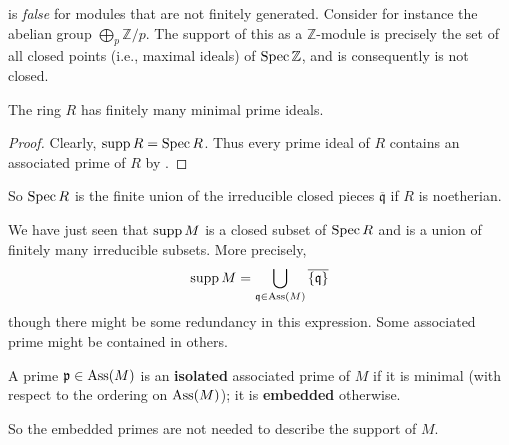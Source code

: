 \begin{example} 
 is \emph{false} for modules that are not finitely
generated. Consider for instance the abelian group $\bigoplus_p \mathbb{Z}/p$.
The support of this as a $\mathbb{Z}$-module is precisely the set of all
closed points (i.e., maximal ideals) of $\operatorname{Spec} \mathbb{Z}$, and is
consequently is not closed. 
\end{example} 

\begin{corollary} 
The ring $R$ has finitely many minimal prime ideals. 
\end{corollary} 
\begin{proof} 
Clearly, $\operatorname{supp} R = \operatorname{Spec} R$. Thus every prime ideal of $R$
contains an associated prime of $R$ by .
\end{proof} 

So $\operatorname{Spec} R$ is the finite union of the  irreducible closed  pieces
$\overline{\mathfrak{q}}$ if $R$ is noetherian.

We have just seen that $\operatorname{supp} M$ is a closed subset of $\operatorname{Spec} R$ and is a union
of finitely many irreducible subsets.  More precisely, 
\[ \operatorname{supp} M = \bigcup_{\mathfrak{q} \in \operatorname{Ass}(M)}
\overline{\left\{\mathfrak{q}\right\}}  \]
though there might be some redundancy in this expression. Some associated prime might be contained
in others.  

\begin{definition} 
A prime $\mathfrak{p} \in \operatorname{Ass}(M)$ is an \textbf{isolated} associated prime of
$M$ if it is minimal (with respect to the ordering on $\operatorname{Ass}(M)$); it is
\textbf{embedded} otherwise. 
\end{definition} 

So the embedded primes are not needed to describe the support of $M$. 


